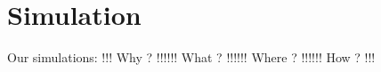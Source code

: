 \chapter{Simulation}\label{ch:sim}
Our simulations:
!!! Why ? !!!!!! What ? !!!!!! Where ? !!!!!! How ? !!!
